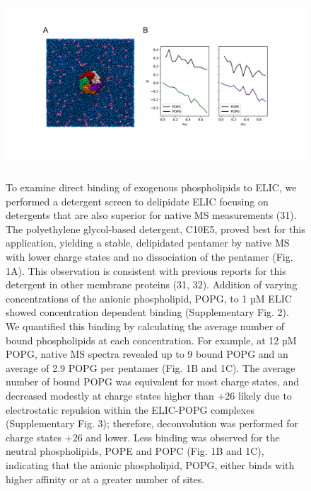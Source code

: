 \begin{figure}
\includegraphics[width=6.12222in,height=2.74444in]{./pandoc_test/media/image2.pdf}
\caption{To examine direct binding of exogenous phospholipids to ELIC, we performed
a detergent screen to delipidate ELIC focusing on detergents that are
also superior for native MS measurements (31). The polyethylene
glycol-based detergent, C10E5, proved best for this application,
yielding a stable, delipidated pentamer by native MS with lower charge
states and no dissociation of the pentamer (Fig. 1A). This observation
is consistent with previous reports for this detergent in other membrane
proteins (31, 32). Addition of varying concentrations of the anionic
phospholipid, POPG, to 1 µM ELIC showed concentration dependent binding
(Supplementary Fig. 2). We quantified this binding by calculating the
average number of bound phospholipids at each concentration. For
example, at 12 µM POPG, native MS spectra revealed up to 9 bound POPG
and an average of 2.9 POPG per pentamer (Fig. 1B and 1C). The average
number of bound POPG was equivalent for most charge states, and
decreased modestly at charge states higher than +26 likely due to
electrostatic repulsion within the ELIC-POPG complexes (Supplementary
Fig. 3); therefore, deconvolution was performed for charge states +26
and lower. Less binding was observed for the neutral phospholipids, POPE
and POPC (Fig. 1B and 1C), indicating that the anionic phospholipid,
POPG, either binds with higher affinity or at a greater number of sites.}
\end{figure}

